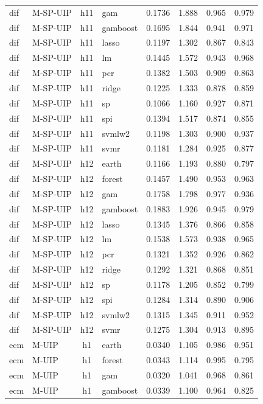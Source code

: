 \begin{ThreePartTable}
\begin{longtable}[t]{llclcccc}
dif & M-SP-UIP & h11 & gam & 0.1736 & 1.888 & 0.965 & 0.979\\
dif & M-SP-UIP & h11 & gamboost & 0.1695 & 1.844 & 0.941 & 0.971\\
dif & M-SP-UIP & h11 & lasso & 0.1197 & 1.302 & 0.867 & 0.843\\
dif & M-SP-UIP & h11 & lm & 0.1445 & 1.572 & 0.943 & 0.968\\
dif & M-SP-UIP & h11 & pcr & 0.1382 & 1.503 & 0.909 & 0.863\\
dif & M-SP-UIP & h11 & ridge & 0.1225 & 1.333 & 0.878 & 0.859\\
dif & M-SP-UIP & h11 & sp & 0.1066 & 1.160 & 0.927 & 0.871\\
dif & M-SP-UIP & h11 & spi & 0.1394 & 1.517 & 0.874 & 0.855\\
dif & M-SP-UIP & h11 & svmlw2 & 0.1198 & 1.303 & 0.900 & 0.937\\
dif & M-SP-UIP & h11 & svmr & 0.1181 & 1.284 & 0.925 & 0.877\\
\addlinespace
dif & M-SP-UIP & h12 & earth & 0.1166 & 1.193 & 0.880 & 0.797\\
dif & M-SP-UIP & h12 & forest & 0.1457 & 1.490 & 0.953 & 0.963\\
dif & M-SP-UIP & h12 & gam & 0.1758 & 1.798 & 0.977 & 0.936\\
dif & M-SP-UIP & h12 & gamboost & 0.1883 & 1.926 & 0.945 & 0.979\\
dif & M-SP-UIP & h12 & lasso & 0.1345 & 1.376 & 0.866 & 0.858\\
dif & M-SP-UIP & h12 & lm & 0.1538 & 1.573 & 0.938 & 0.965\\
dif & M-SP-UIP & h12 & pcr & 0.1321 & 1.352 & 0.926 & 0.862\\
dif & M-SP-UIP & h12 & ridge & 0.1292 & 1.321 & 0.868 & 0.851\\
dif & M-SP-UIP & h12 & sp & 0.1178 & 1.205 & 0.852 & 0.799\\
dif & M-SP-UIP & h12 & spi & 0.1284 & 1.314 & 0.890 & 0.906\\
dif & M-SP-UIP & h12 & svmlw2 & 0.1315 & 1.345 & 0.911 & 0.952\\
dif & M-SP-UIP & h12 & svmr & 0.1275 & 1.304 & 0.913 & 0.895\\
\addlinespace
ecm & M-UIP & h1 & earth & 0.0340 & 1.105 & 0.986 & 0.951\\
ecm & M-UIP & h1 & forest & 0.0343 & 1.114 & 0.995 & 0.795\\
ecm & M-UIP & h1 & gam & 0.0320 & 1.041 & 0.968 & 0.861\\
ecm & M-UIP & h1 & gamboost & 0.0339 & 1.100 & 0.964 & 0.825\\

\end{longtable}
\end{ThreePartTable}
